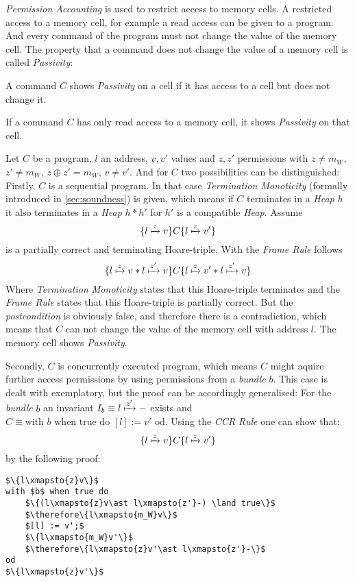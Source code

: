 	\emph{Permission Accounting} is used to restrict access to memory cells.
	A restricted access to a memory cell, for example a read access can be
	given to a program. And every command of the program must not change
	the value of the memory cell. The property that a command does not change
	the value of a memory cell is called \emph{Passivity}:
	\begin{myprop}[Passivity]
		A command $C$ shows \emph{Passivity} on a cell if it has access to
		a cell but does not change it.
	\end{myprop}
	\begin{mylem}
		If a command $C$ has only read access to a memory cell, it shows
		\emph{Passivity} on that cell.
	\end{mylem}
	\begin{myproof}
		Let $C$ be a program, $l$ an address, $v,v'$ values and $z,z'$
		permissions with $z\neq m_W$, $z'\neq m_W$, $z \oplus z' = m_W$,
		$v \neq v'$. And for $C$ two possibilities can be distinguished:
		Firstly, $C$ is a sequential program. In that case \emph{Termination
		Monoticity} (formally introduced in \ref{sec:soundness}) is given,
		which means if $C$ terminates in a \emph{Heap} $h$ it also terminates
		in a \emph{Heap} $h\ast h'$ for $h'$ is a compatible \emph{Heap}.
		Assume
		$$\{l\xmapsto{z}v\}C\{l\xmapsto{z}v'\}$$
		is a partially correct and terminating Hoare-triple. With the
		\emph{Frame Rule} follows
		$$\{l\xmapsto{z}v \ast l\xmapsto{z'}v\}C\{l\xmapsto{z}v' \ast l\xmapsto{z'} v\}$$
		Where \emph{Termination Monoticity} states that this Hoare-triple terminates
		and the \emph{Frame Rule} states that this Hoare-triple is partially correct.
		But the \emph{postcondition} is obviously false, and therefore there is a
		contradiction, which means that $C$ can not change the value of the
		memory cell with address $l$. The memory cell shows \emph{Passivity}.

		Secondly, $C$ is concurrently executed program, which means $C$ might aquire
		further access permissions by using permissions from a \emph{bundle}
		$b$. This case is dealt with exemplatory, but the proof can be
		accordingly generalised:
		For the \emph{bundle} $b$ an invariant $I_b \equiv l\xmapsto{z'}-$ exists
		and $C \equiv \text{with }b\text{ when true do } [l] := v' \text{ od}$.
		Using the \emph{CCR Rule} one can show that:
		$$\{l\xmapsto{z}v\}C\{l\xmapsto{z}v'\}$$
		by the following proof:

		\begin{lstlisting}[mathescape]
$\{l\xmapsto{z}v\}$
with $b$ when true do
	$\{(l\xmapsto{z}v\ast l\xmapsto{z'}-) \land true\}$
	$\therefore\{l\xmapsto{m_W}v\}$
	$[l] := v';$
	$\{l\xmapsto{m_W}v'\}$
	$\therefore\{l\xmapsto{z}v'\ast l\xmapsto{z'}-\}$
od
$\{l\xmapsto{z}v'\}$
		\end{lstlisting}


\end{myproof}
